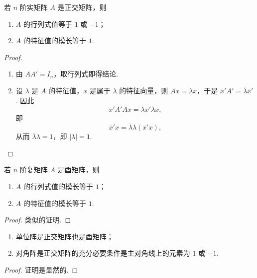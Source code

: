 \documentclass[../../main.tex]{subfiles}%
\begin{document}
\begin{theorem}\label{theorem:正交矩阵的行列式和特征值}
若 $n$ 阶实矩阵 $A$ 是正交矩阵，则
\begin{enumerate}[(1)]
\item $A$ 的行列式值等于 $1$ 或 $-1$；

\item $A$ 的特征值的模长等于 $1$.
\end{enumerate}
\end{theorem}
\begin{proof}
\begin{enumerate}[(1)]
\item 由 $AA' = I_n$，取行列式即得结论.

\item 设 $\lambda$ 是 $A$ 的特征值，$x$ 是属于 $\lambda$ 的特征向量，则 $Ax = \lambda x$，于是 $\overline{x}'A' = \overline{\lambda}\overline{x}'$. 因此
\[
\overline{x}'A'Ax = \overline{\lambda}\overline{x}'\lambda x,
\]
即
\[
\overline{x}'x = \overline{\lambda}\lambda(\overline{x}'x),
\]
从而 $\overline{\lambda}\lambda = 1$，即 $|\lambda| = 1$. 
\end{enumerate}

\end{proof}

\begin{theorem}\label{theorem:酉矩阵的行列式和特征值}
若 $n$ 阶复矩阵 $A$ 是酉矩阵，则
\begin{enumerate}
\item $A$ 的行列式值的模长等于 $1$；

\item $A$ 的特征值的模长等于 $1$.
\end{enumerate}
\end{theorem}
\begin{proof}

类似的证明.

\end{proof}

\begin{proposition}\label{proposition:常见的正交矩阵和酉矩阵}
\begin{enumerate}[(1)]
\item 单位阵是正交矩阵也是酉矩阵；

\item 对角阵是正交矩阵的充分必要条件是主对角线上的元素为 $1$ 或 $-1$. 
\end{enumerate}
\end{proposition}
\begin{proof}

证明是显然的.

\end{proof}
\end{document}
